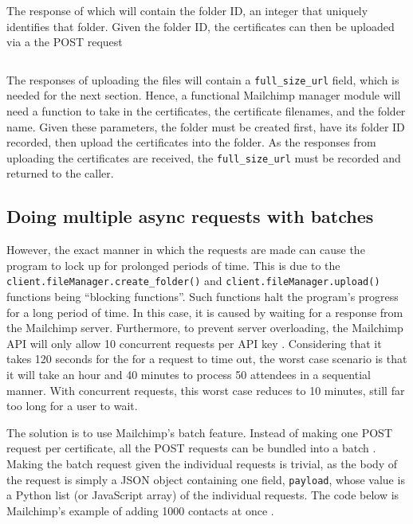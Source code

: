 \documentclass[11pt]{article}
\begin{document}
\noindent
The response of which will contain the folder ID, an integer that uniquely identifies that folder. Given the folder ID, the certificates can then be uploaded via a the POST request \cite{mailchimp-add-file}

\inputminted[linenos=true]{python}{mailchimp_examples/upload_file.py}

\noindent
The responses of uploading the files will contain a \texttt{full\_size\_url} field, which is needed for the next section. Hence, a functional Mailchimp manager module will need a function to take in the certificates, the certificate filenames, and the folder name. Given these parameters, the folder must be created first, have its folder ID recorded, then upload the certificates into the folder. As the responses from uploading the certificates are received, the \texttt{full\_size\_url} must be recorded and returned to the caller.

\subsection{Doing multiple async requests with batches}

However, the exact manner in which the requests are made can cause the program to lock up for prolonged periods of time. This is due to the \texttt{client.fileManager.create_folder()} and \texttt{client.fileManager.upload()} functions being ``blocking functions''. Such functions halt the program's progress for a long period of time. In this case, it is caused by waiting for a response from the Mailchimp server. Furthermore, to prevent server overloading, the Mailchimp API will only allow 10 concurrent requests per API key \cite{mailchimp-batch}. Considering that it takes 120 seconds for the for a request to time out, the worst case scenario is that it will take an hour and 40 minutes to process 50 attendees in a sequential manner. With concurrent requests, this worst case reduces to 10 minutes, still far too long for a user to wait.

The solution is to use Mailchimp's batch feature. Instead of making one POST request per certificate, all the POST requests can be bundled into a batch \cite{mailchimp-batch}. Making the batch request given the individual requests is trivial, as the body of the request is simply a JSON object containing one field, \texttt{payload}, whose value is a Python list (or JavaScript array) of the individual requests. The code below is Mailchimp's example of adding 1000 contacts at once \cite{mailchimp-batch}.
\end{document}
